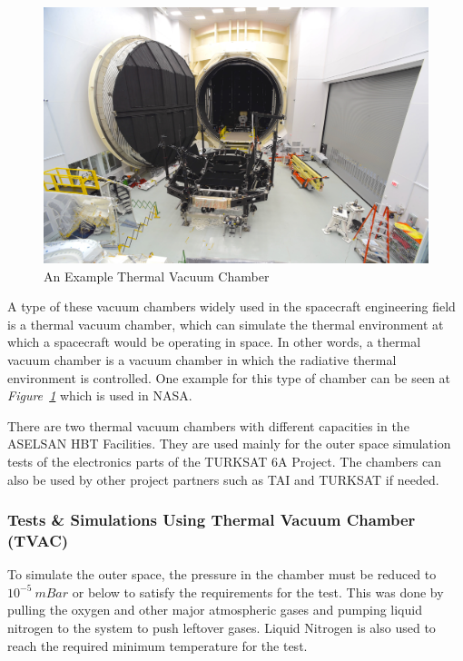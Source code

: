 \begin{figure}[H]
	\center
	\setlength{\unitlength}{\textwidth} 
	\includegraphics[width=0.9\unitlength]{tvac}
	\caption{\label{fig:tvac}An Example Thermal Vacuum Chamber }
\end{figure}

	A type of these vacuum chambers widely used in the spacecraft engineering field is a thermal vacuum chamber, which can simulate the thermal environment at which a spacecraft would be operating in space. In other words,	a thermal vacuum chamber is a vacuum chamber in which the radiative thermal environment is controlled. One example for this type of chamber can be seen at \textit{Figure~\ref{fig:tvac}} which is used in NASA.


	There are two thermal vacuum chambers with different capacities in the ASELSAN HBT Facilities. They are used mainly for the outer space simulation tests of the electronics parts of the TURKSAT 6A Project. The chambers can also be used by other project partners such as TAI and TURKSAT if needed.
	
\subsubsection{Tests \& Simulations Using Thermal Vacuum Chamber (TVAC) }

	To simulate the outer space, the pressure in the chamber must be reduced to $10^{-5}~mBar$ or below to satisfy the requirements for the test. This was done by pulling the oxygen and other major atmospheric gases and pumping liquid nitrogen to the system to push leftover gases. Liquid Nitrogen is also used to reach the required minimum temperature for the test.
	

